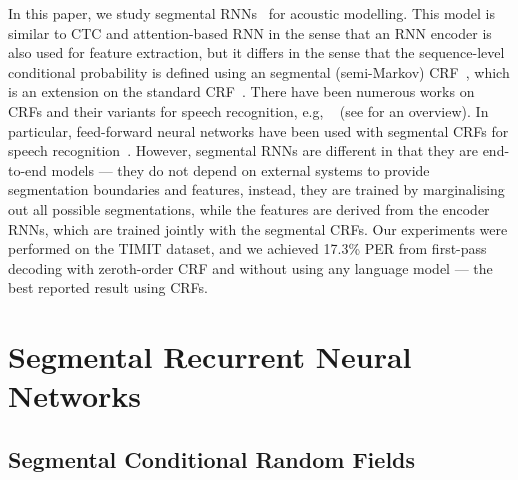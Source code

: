 \documentclass[a4paper]{article}
\begin{document}
In this paper, we study segmental RNNs~\cite{kong2015segmental} for acoustic modelling. This model is similar to CTC and attention-based RNN in the sense that an RNN encoder is also used for feature extraction, but it differs in the sense that the sequence-level conditional probability is defined using an segmental (semi-Markov) CRF~\cite{sarawagi2004semi}, which is an extension on the standard CRF~\cite{lafferty2001conditional}. There have been numerous works on CRFs and their variants for speech recognition, e.g, ~\cite{gunawardana2005hidden, hifny2009speech, zweig2011speech} (see \cite{fosler2013conditional} for an overview). In particular, feed-forward neural networks have been used with segmental CRFs for speech recognition~\cite{abdel2013deep, he2015segmental}. However, segmental RNNs are different in that they are end-to-end models --- they do not depend on external systems to provide segmentation boundaries and features, instead, they are trained by marginalising out all possible segmentations, while the features are derived from the encoder RNNs, which are trained jointly with the segmental CRFs. Our experiments were performed on the TIMIT dataset, and we achieved 17.3\% PER from first-pass decoding with zeroth-order CRF and without using any language model --- the best reported result using CRFs. 
 




\section{Segmental Recurrent Neural Networks}



\subsection{Segmental Conditional Random Fields}
\end{document}
